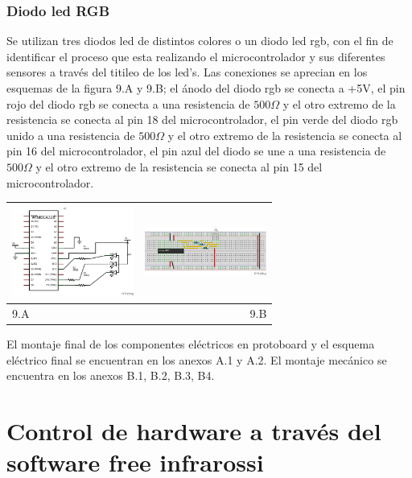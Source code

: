 \documentclass[12]{article}
\newenvironment{Figure}
{\par\medskip\noindent\minipage{\linewidth}}
{\endminipage\par\medskip}
\begin{document}
\begin{multicols}{2}
\subsubsection{Diodo led RGB}
Se utilizan tres diodos led de distintos colores o un diodo led rgb, con el fin de identificar el proceso que esta realizando el microcontrolador y sus diferentes sensores a través del titileo de los led's.
Las conexiones se aprecian en los esquemas de la figura 9.A y 9.B;  el ánodo del diodo rgb se conecta a +5V, el pin rojo del diodo rgb se conecta a una resistencia de $500\Omega$ y el otro extremo de la resistencia se conecta al pin 18 del microcontrolador, el pin verde del diodo rgb unido a una resistencia de $500\Omega$ y el otro extremo de la resistencia se conecta al pin 16 del microcontrolador, el pin azul del diodo se une a una resistencia de $500\Omega$ y el otro extremo de la resistencia se conecta al pin 15 del microcontrolador.\\
\begin{Figure}	
\center
\begin{tabular}{|l|r|}
\hline
\includegraphics[width=4cm, height=3cm]{img/rgbesq.png} & \includegraphics[width=4cm, height=3cm]{img/rgbmont.png} \\ \hline
9.A & 9.B \\ \hline
\end{tabular}
\label{fig:g9}
\end{Figure}
\vspace{0.6 cm}
El montaje final de los componentes eléctricos en protoboard y el esquema eléctrico final se encuentran en los anexos A.1 y A.2.
El montaje mecánico se encuentra en los anexos B.1, B.2,  B.3, B4. %
\section{Control de hardware a través del software free infrarossi}

\end{multicols}
\end{document}
